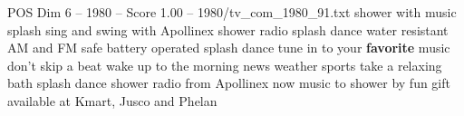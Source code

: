 \begin{textsample}{POS Dim 6 – 1980 – Score 1.00 – 1980/tv\_com\_1980\_91.txt}  \label{ex:f6_pos_058}
shower with music splash sing and swing with Apollinex shower radio splash dance water resistant AM and FM safe battery operated splash dance tune in to your \textbf{favorite} music don't skip a beat wake up to the morning news weather sports take a relaxing bath splash dance shower radio from Apollinex now music to shower by fun gift available at Kmart, Jusco and Phelan

\end{textsample}
